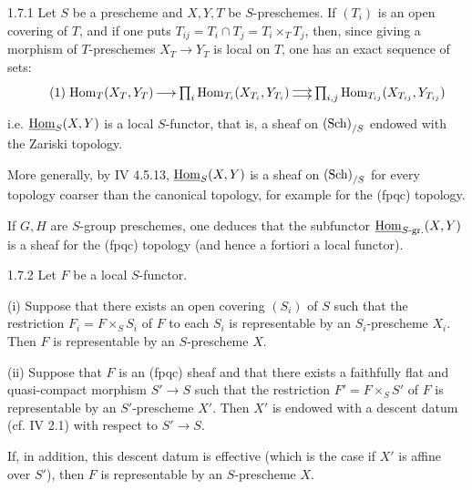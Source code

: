\begin{scholium}{1.7.1}\label{VIII.1.7.1}
Let $S$ be a prescheme and $X,Y,T$ be $S$-preschemes. If $(T_i)$ is an open covering of $T$, and if one puts $T_{ij}=T_i\cap T_j=T_i\times_T T_j$, then, since giving a morphism of $T$-preschemes $X_T\to Y_T$ is local on $T$, one has an exact sequence of sets:
\begin{equation}\tag{1}
\xymatrix@C=14pt{\Hom_T(X_T,Y_T)\ar[r]&\prod_i\Hom_{T_i}(X_{T_i},Y_{T_i})\ar@<.5ex>[r]\ar@<-.5ex>[r]&\prod_{i,j}\Hom_{T_{ij}}(X_{T_{ij}},Y_{T_{ij}})}
\end{equation}
i.e. $\underline{\operatorname{Hom}}_S(X,Y)$ is a local $S$-functor, that is, a sheaf on $\textup{(Sch)}_{/S}$ endowed with the Zariski topology.

More generally, by IV 4.5.13, $\underline{\operatorname{Hom}}_S(X,Y)$ is a sheaf on $\textup{(Sch)}_{/S}$ for every topology coarser than the canonical topology, for example for the (fpqc) topology.

If $G,H$ are $S$-group preschemes, one deduces that the subfunctor $\underline{\operatorname{Hom}}_{S\text{-}\mathrm{gr.}}(X,Y)$ is a sheaf for the (fpqc) topology (and hence a fortiori a local functor).
\end{scholium}
\begin{lemma}{1.7.2}\label{VIII.1.7.2}
 Let $F$ be a local $S$-functor.

(i) Suppose that there exists an open covering $(S_i)$ of $S$ such that the restriction $F_i=F\times_S S_i$ of $F$ to each $S_i$ is representable by an $S_i$-prescheme $X_i$. Then $F$ is representable by an $S$-prescheme $X$.

(ii) Suppose that $F$ is an (fpqc) sheaf and that there exists a faithfully flat and quasi-compact morphism $S'\to S$ such that the restriction $F'=F\times_S S'$ of $F$ is representable by an $S'$-prescheme $X'$. Then $X'$ is endowed with a descent datum (cf. IV 2.1) with respect to $S'\to S$.

If, in addition, this descent datum is effective (which is the case if $X'$ is affine over $S'$), then $F$ is representable by an $S$-prescheme $X$.
\end{lemma}
